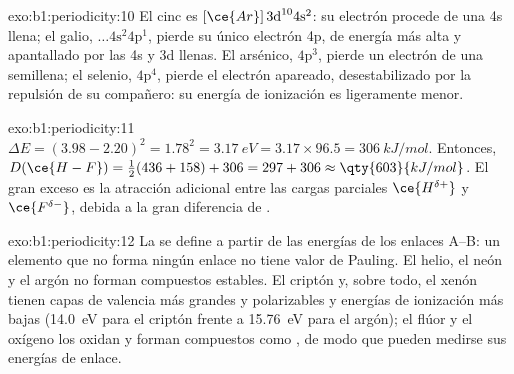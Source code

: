 \begin{solution}{exo:b1:periodicity:10}
El cinc es $[\ce{Ar}]\,3\text{d}^{10} 4\text{s}^2$: su electrón procede
de una  4s llena; el galio, $\dots 4\text{s}^2 4\text{p}^1$, pierde
su único electrón 4p, de energía más alta y apantallado por las 
4s y 3d llenas. El arsénico, $4\text{p}^3$, pierde un electrón de una
 semillena; el selenio, $4\text{p}^4$, pierde el electrón
apareado, desestabilizado por la repulsión de su compañero: su energía de
ionización es ligeramente menor.
\end{solution}

\begin{solution}{exo:b1:periodicity:11}
$\Delta E = (3.98 - 2.20)^2 = 1.78^2 = \qty{3.17}{eV} = 3.17 \times 96.5 =
\qty{306}{kJ/mol}$. Entonces, $D(\ce{H-F}) = \tfrac12(436 + 158) + 306 = 297 +
306 \approx \qty{603}{kJ/mol}$. El gran exceso es la atracción adicional
entre las cargas parciales $\ce{H^{\delta+}}$ y $\ce{F^{\delta-}}$, debida
a la gran diferencia de .
\end{solution}

\begin{solution}{exo:b1:periodicity:12}
La  se define a partir de las energías de los enlaces
A--B: un elemento que no forma ningún enlace no tiene valor de Pauling.
El helio, el neón y el argón no forman compuestos estables. El criptón y,
sobre todo, el xenón tienen capas de valencia más grandes y polarizables y
energías de ionización más bajas (\qty{14.0}{eV} para el criptón frente a
\qty{15.76}{eV} para el argón); el flúor y el oxígeno los oxidan y forman
compuestos como , de modo que pueden medirse sus energías de
enlace.
\end{solution}


